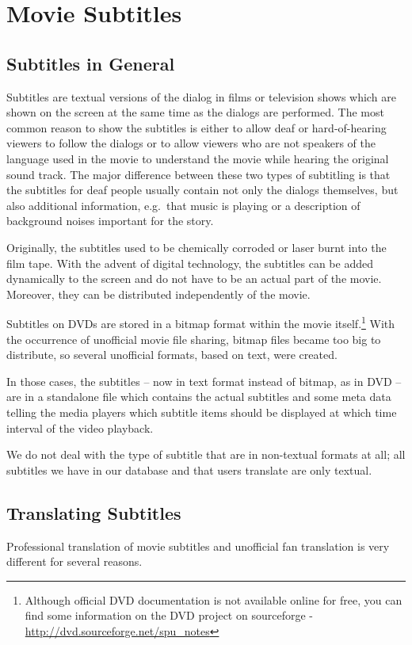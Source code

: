 \section{Movie Subtitles}
\subsection{Subtitles in General}

Subtitles are textual versions of the dialog in films or television shows which are shown on the screen at the same time as the dialogs are performed. The most common reason to show the subtitles is either to allow deaf or hard-of-hearing viewers to follow the dialogs or to allow viewers who are not speakers of the language used in the movie to understand the movie while hearing the original sound track. The major difference between these two types of subtitling is that the subtitles for deaf people usually contain not only the dialogs themselves, but also additional information, e.g.\ that music is playing or a description of background noises important for the story.

Originally, the subtitles used to be chemically corroded or laser burnt into the film tape. With the advent of digital technology, the subtitles can be added dynamically to the screen and do not have to be an actual part of the movie. Moreover, they can be distributed independently of the movie.

Subtitles on DVDs are stored in a bitmap format within the movie itself.\footnote{Although official DVD documentation is not available online for free, you can find some information on the DVD project on sourceforge - \url{http://dvd.sourceforge.net/spu_notes}} With the occurrence of unofficial movie file sharing, bitmap files became too big to distribute, so several unofficial formats, based on text, were created.

In those cases, the subtitles -- now in text format instead of bitmap, as in DVD -- are in a standalone file which contains the actual subtitles and some meta data telling the media players which subtitle items should be displayed at which time interval of the video playback.

We do not deal with the type of subtitle that are in non-textual formats at all; all subtitles we have in our database and that users translate are only textual.

\subsection{Translating Subtitles}
Professional translation of movie subtitles and unofficial fan translation is very different for several reasons.

